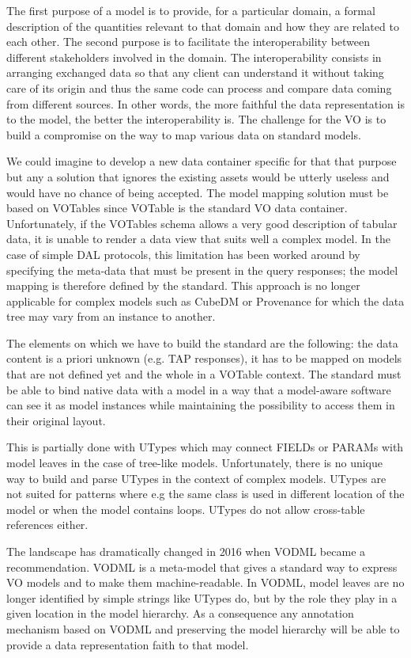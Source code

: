 
The first purpose of a model is to provide, for a particular domain, a formal description of the quantities relevant to that domain and how they are related to each other.
The second purpose is to facilitate the interoperability between  different stakeholders involved in the domain. The interoperability consists in arranging exchanged data 
so that any client can understand it without taking care of its origin and thus the same code can process and compare data coming from different sources.  
In other words, the more faithful the data representation is to the model, the better the interoperability is.
The challenge for the VO is to build a compromise on the way to map various data on standard models.

We could imagine to develop a new data container specific for that that purpose but any a solution that ignores the existing assets would be utterly useless and would have no chance of being accepted.
The model mapping solution must be based on VOTables since VOTable  \citep{2019ivoa.spec.1021O} is the standard VO data container.
Unfortunately, if the VOTables schema allows a very good description of tabular data, it is unable to render a data view that suits well a complex model.
In the case of simple DAL protocols, this limitation has been worked around by specifying the meta-data that must be present in the query responses; the model mapping is therefore defined by the standard.
This approach is no longer applicable for complex models such as CubeDM or Provenance for which the data tree may vary from an instance to another.

The elements on which we have to build the standard are the following: the data content is a priori unknown (e.g. TAP responses), it has to be mapped on models that are not defined yet and the whole in a VOTable context.
The standard must be able to bind native data with a model in a way that a model-aware software can see it as 
model instances while maintaining the possibility to access them in their original layout.

This is partially done with UTypes which may connect FIELDs or PARAMs with model leaves in the case of tree-like models. 
Unfortunately, there is no unique  way to build and parse UTypes in the context of complex models. 
UTypes are not suited for patterns where e.g the same class is used in different location of the model or when the model contains loops. 
UTypes do not allow cross-table references either.

The landscape has dramatically changed in 2016 when VODML \citep{2018ivoa.spec.0910L} became a recommendation. 
VODML is a meta-model that gives a standard way to express VO models and to make them machine-readable.
In VODML, model leaves are no longer identified by simple strings like UTypes do, but by the role they play in a given location in the model hierarchy.
As a consequence any annotation mechanism based on VODML and preserving the model hierarchy will be able  to provide a data representation faith to that model.

